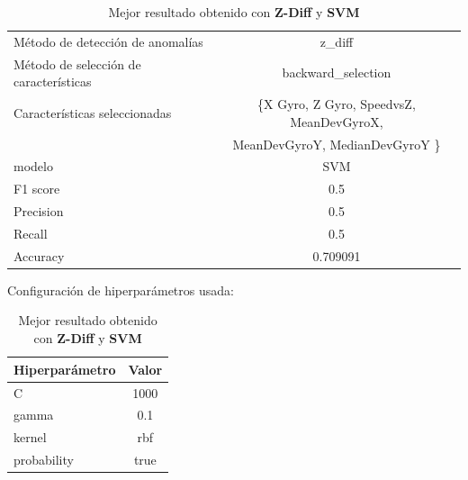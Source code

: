 \begin{appendices}
		\begin{table}[htb]
			\centering
			\caption{Mejor resultado obtenido con \textbf{Z-Diff} y \textbf{SVM}}
			\label{table:26}
			\begin{tabular}{lc}
				\toprule
				\midrule
					  Método de detección de anomalías &                                             z\_diff \\
				Método de selección de características &                                 backward\_selection \\
						 Características seleccionadas & \{X Gyro, Z Gyro, SpeedvsZ, MeanDevGyroX, \\
						 							   &      MeanDevGyroY, MedianDevGyroY \} \\
												modelo &                                                SVM \\
											  F1 score &                                                0.5 \\
											 Precision &                                                0.5 \\
												Recall &                                                0.5 \\
											  Accuracy &                                           0.709091 \\
				\bottomrule
				\end{tabular}
			\newline
			\newline
			Configuración de hiperparámetros usada:
			\begin{tabular}{lc}
			\toprule
			Hiperparámetro & Valor \\
			\midrule
						 C &  1000 \\
					 gamma &   0.1 \\
					kernel &   rbf \\
			   probability &  true \\
			\bottomrule
			\end{tabular}
			
		\end{table}

		\begin{table}[htb]
			\centering
			\caption{Mejor resultado obtenido con \textbf{DBSCAN} y \textbf{SVM}}
			\label{table:27}


\end{table}
\end{appendices}
